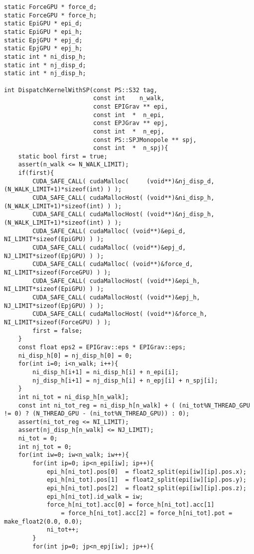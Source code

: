 \begin{lstlisting}[caption=calcForceDispatch]
static ForceGPU * force_d;
static ForceGPU * force_h;
static EpiGPU * epi_d;
static EpiGPU * epi_h;
static EpjGPU * epj_d;
static EpjGPU * epj_h;
static int * ni_disp_h;
static int * nj_disp_d;
static int * nj_disp_h;

int DispatchKernelWithSP(const PS::S32 tag,
                         const int    n_walk,
                         const EPIGrav ** epi,
                         const int  *  n_epi,
                         const EPJGrav ** epj,
                         const int  *  n_epj,
                         const PS::SPJMonopole ** spj,
                         const int  *  n_spj){
    static bool first = true;
    assert(n_walk <= N_WALK_LIMIT);
    if(first){
        CUDA_SAFE_CALL( cudaMalloc(     (void**)&nj_disp_d,  (N_WALK_LIMIT+1)*sizeof(int) ) );
        CUDA_SAFE_CALL( cudaMallocHost( (void**)&ni_disp_h,  (N_WALK_LIMIT+1)*sizeof(int) ) );
        CUDA_SAFE_CALL( cudaMallocHost( (void**)&nj_disp_h,  (N_WALK_LIMIT+1)*sizeof(int) ) );
        CUDA_SAFE_CALL( cudaMalloc( (void**)&epi_d,       NI_LIMIT*sizeof(EpiGPU) ) );
        CUDA_SAFE_CALL( cudaMalloc( (void**)&epj_d,       NJ_LIMIT*sizeof(EpjGPU) ) );
        CUDA_SAFE_CALL( cudaMalloc( (void**)&force_d,     NI_LIMIT*sizeof(ForceGPU) ) );
        CUDA_SAFE_CALL( cudaMallocHost( (void**)&epi_h,   NI_LIMIT*sizeof(EpiGPU) ) );
        CUDA_SAFE_CALL( cudaMallocHost( (void**)&epj_h,   NJ_LIMIT*sizeof(EpjGPU) ) );
        CUDA_SAFE_CALL( cudaMallocHost( (void**)&force_h, NI_LIMIT*sizeof(ForceGPU) ) );
        first = false;
    }
    const float eps2 = EPIGrav::eps * EPIGrav::eps;
    ni_disp_h[0] = nj_disp_h[0] = 0;
    for(int i=0; i<n_walk; i++){
        ni_disp_h[i+1] = ni_disp_h[i] + n_epi[i];
        nj_disp_h[i+1] = nj_disp_h[i] + n_epj[i] + n_spj[i];
    }
    int ni_tot = ni_disp_h[n_walk];
    const int ni_tot_reg = ni_disp_h[n_walk] + ( (ni_tot%N_THREAD_GPU != 0) ? (N_THREAD_GPU - (ni_tot%N_THREAD_GPU)) : 0);
    assert(ni_tot_reg <= NI_LIMIT);
    assert(nj_disp_h[n_walk] <= NJ_LIMIT);
    ni_tot = 0;
    int nj_tot = 0;
    for(int iw=0; iw<n_walk; iw++){
        for(int ip=0; ip<n_epi[iw]; ip++){
            epi_h[ni_tot].pos[0]  = float2_split(epi[iw][ip].pos.x);
            epi_h[ni_tot].pos[1]  = float2_split(epi[iw][ip].pos.y);
            epi_h[ni_tot].pos[2]  = float2_split(epi[iw][ip].pos.z);
            epi_h[ni_tot].id_walk = iw;
            force_h[ni_tot].acc[0] = force_h[ni_tot].acc[1] 
                = force_h[ni_tot].acc[2] = force_h[ni_tot].pot = make_float2(0.0, 0.0);
            ni_tot++;
        }
        for(int jp=0; jp<n_epj[iw]; jp++){

\end{lstlisting}
